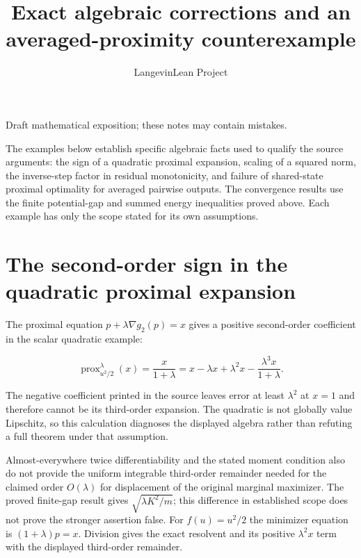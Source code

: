 \documentclass[11pt,a4paper]{article}
\title{\texorpdfstring{Exact algebraic corrections and an averaged-proximity counterexample}{Exact algebraic corrections and an averaged-proximity counterexample}}
\author{LangevinLean Project}
\date{}
\begin{document}
\maketitle
Draft mathematical exposition; these notes may contain mistakes.


The examples below establish specific algebraic facts used to qualify the source arguments: the sign of a quadratic proximal expansion, scaling of a squared norm, the inverse-step factor in residual monotonicity, and failure of shared-state proximal optimality for averaged pairwise outputs. The convergence results use the finite potential-gap and summed energy inequalities proved above. Each example has only the scope stated for its own assumptions.



\section{\texorpdfstring{The second-order sign in the quadratic proximal expansion}{The second-order sign in the quadratic proximal expansion}}


The proximal equation \(p+\lambda\nabla g_2(p)=x\) gives a positive second-order coefficient in the scalar quadratic example:

\[
\operatorname{prox}_{u^2/2}^\lambda(x)
=\frac{x}{1+\lambda}
=x-\lambda x+\lambda^2x-\frac{\lambda^3x}{1+\lambda}.
\]

The negative coefficient printed in the source leaves error at least \(\lambda^2\) at \(x=1\) and therefore cannot be its third-order expansion. The quadratic is not globally value Lipschitz, so this calculation diagnoses the displayed algebra rather than refuting a full theorem under that assumption.



Almost-everywhere twice differentiability and the stated moment condition also do not provide the uniform integrable third-order remainder needed for the claimed order \(O(\lambda)\) for displacement of the original marginal maximizer. The proved finite-gap result gives \(\sqrt{\lambda K^2/m}\); this difference in established scope does not prove the stronger assertion false. For \(f(u)=u^2/2\) the minimizer equation is \((1+\lambda)p=x\). Division gives the exact resolvent and its positive \(\lambda^2x\) term with the displayed third-order remainder.
\end{document}
